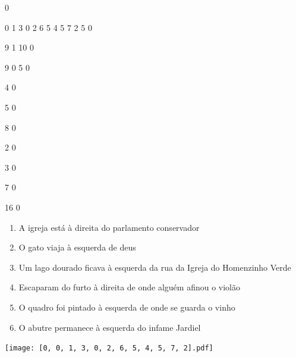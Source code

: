 \documentclass[12pt]{article}
\begin{document}
		\vfill  
		  
{
	0	%

	0	%
	1	%
	3	%
	0	%
	2	%
	6	%
	5	%
	4	%
	5	%
	7	%
	2	%
	5	%
	0	%

	9	%
	1	%
	10	%
	0	%

	9	%
	0	%
	5	%
	0	%

	4	%
	0	%

	5	%
	0	%

	8	%
	0	%

	2	%
	0	%

	3	%
	0	%

	7	%
	0	%

	16	%
	0	%

}	  
		    	

		 

\pagebreak


	\begin{enumerate}
		  \sffamily %
		  \large %


\vfill \item
A igreja está	%
à direita
do parlamento conservador	%

\vfill \item
O gato viaja	%
à esquerda
de deus	%

\vfill \item
Um lago dourado ficava	%
à esquerda
da rua da Igreja do Homenzinho Verde	%

\vfill \item
Escaparam do furto	%
à direita
de onde alguém afinou o violão	%

\vfill \item
O quadro foi pintado	%
à esquerda
de onde se guarda o vinho	%

\vfill \item
O abutre permanece	%
à esquerda
do infame Jardiel	%
	\end{enumerate}
		  
		  \hfill

		  \vfill

\texttt{[image: [0, 0, 1, 3, 0, 2, 6, 5, 4, 5, 7, 2].pdf]}


	\hfill	  	  
\end{document}
